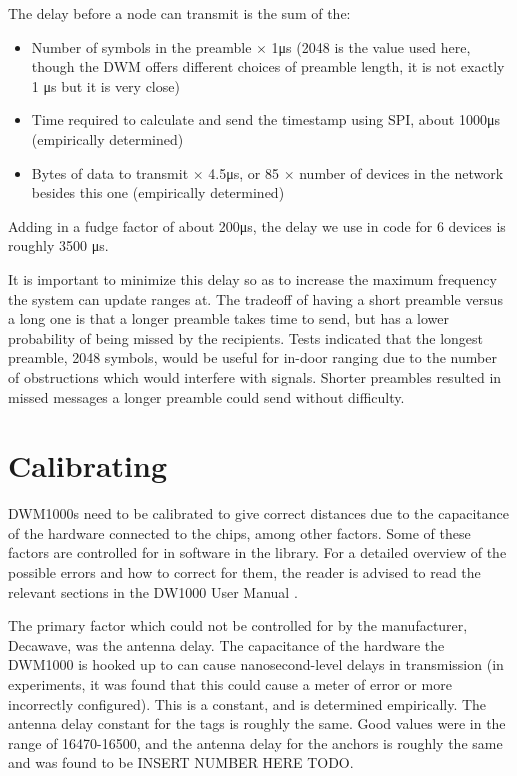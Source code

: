 The delay before a node can transmit is the sum of the:
\begin{itemize}
	\item Number of symbols in the preamble $\times$ 1\si{\micro\second} (2048 is the value used here, though the DWM offers different choices of preamble length, it is not exactly 1 \si{\micro\second} but it is very close)
	\item Time required to calculate and send the timestamp using SPI, about 1000\si{\micro\second} (empirically determined)
	\item Bytes of data to transmit $\times$ 4.5\si{\micro\second}, or 85 $\times$ number of devices in the network besides this one (empirically determined)
\end{itemize}

Adding in a fudge factor of about 200\si{\micro\second}, the delay we use in code for 6 devices is roughly 3500 \si{\micro\second}.

It is important to minimize this delay so as to increase the maximum frequency the system can update ranges at. The tradeoff of having a short preamble versus a long one is that a longer preamble takes time to send, but has a lower probability of being missed by the recipients. Tests indicated that the longest preamble, 2048 symbols, would be useful for in-door ranging due to the number of obstructions which would interfere with signals.  Shorter preambles resulted in missed messages a longer preamble could send without difficulty.

\section{Calibrating}
DWM1000s need to be calibrated to give correct distances due to the capacitance of the hardware connected to the chips, among other factors. Some of these factors are controlled for in software in the  library. For a detailed overview of the possible errors and how to correct for them, the reader is advised to read the relevant sections in the DW1000 User Manual \cite{DW1000UserManual}.

The primary factor which could not be controlled for by the manufacturer, Decawave, was the antenna delay. The capacitance of the hardware the DWM1000 is hooked up to can cause nanosecond-level delays in transmission (in experiments, it was found that this could cause a meter of error or more incorrectly configured). This is a constant, and is determined empirically. The antenna delay constant for the tags is roughly the same. Good values were in the range of 16470-16500, and the antenna delay for the anchors is roughly the same and was found to be INSERT NUMBER HERE TODO.

